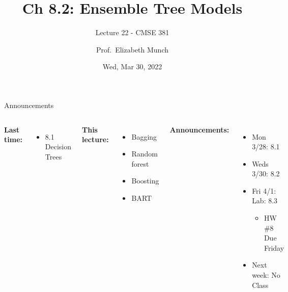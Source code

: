 \documentclass[aspectratio=169,usenames,dvipsnames]{beamer}
\begin{document}
\title[]{Ch 8.2: Ensemble Tree Models}
\subtitle{Lecture 22 - CMSE 381}
\date{Wed, Mar 30, 2022}



\author[Dr.~Munch]{Prof.~Elizabeth Munch}

\begin{frame}
 \titlepage


\end{frame}
\begin{frame}[c]{Announcements }

\begin{columns}
\centering

	\textbf{Last time:}
	\begin{itemize}
	\item 8.1 Decision Trees
	\end{itemize}

	\vspace{.2in}

	\textbf{This lecture:}
	\begin{itemize}
	\item Bagging
	\item Random forest
	\item Boosting
	\item BART
\end{itemize}


\centering

\textbf{Announcements:}
	\begin{itemize}
	\item Mon 3/28: 8.1
	\item Weds 3/30: 8.2
	\item Fri 4/1: Lab: 8.3
	\begin{itemize}
		\item HW \#8 Due Friday
	\end{itemize}
	\item Next week: No Class

	\end{itemize}
\end{columns}

\end{frame}
\end{document}
